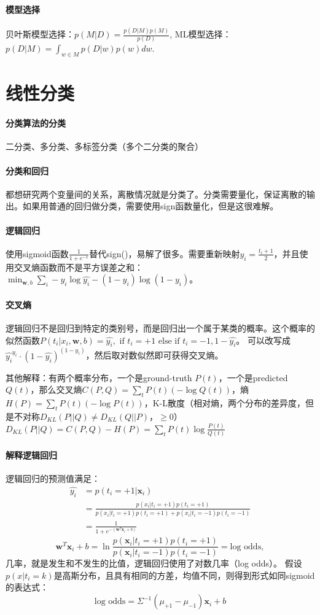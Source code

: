 \paragraph{模型选择} 
贝叶斯模型选择：$p(M|D) = \frac{p(D|M)p(M)}{p(D)}$,
ML模型选择：$p(D|M)=\int_{w\in M} p(D|w)p(w)dw$.

\section{线性分类}

\paragraph{分类算法的分类}二分类、多分类、多标签分类（多个二分类的聚合）

\paragraph{分类和回归} 都想研究两个变量间的关系，离散情况就是分类了。分类需要量化，保证离散的输出。如果用普通的回归做分类，需要使用sign函数量化，但是这很难解。

\paragraph{逻辑回归} 使用sigmoid函数$\frac{1}{1+e^{-x}}$替代sign()，易解了很多。需要重新映射$y_i = \frac{t_i + 1}{2}$，并且使用交叉熵函数而不是平方误差之和：$\min_{\bm w, b} \sum_i - y_i\log\hat{y_i} - (1-y_i)\log(1-y_i)。$

\paragraph{交叉熵} 逻辑回归不是回归到特定的类别号，而是回归出一个属于某类的概率。这个概率的似然函数$P(t_i|x_i,\bm w,b) = \hat{y_i},\text{ if }t_i = +1\text{ else if }t_i = -1, 1 - \hat{y_i}$。
可以改写成$\hat{y_i}^{y_i}\cdot(1-\hat{y_i})^{(1-y_i)}$，然后取对数似然即可获得交叉熵。

其他解释：有两个概率分布，一个是ground-truth $P(t)$，一个是predicted $Q(t)$，那么交叉熵$C(P,Q) = \sum_tP(t)(-\log Q(t))$，熵$H(P)=\sum_tP(t)(-\log P(t))$，K-L散度（相对熵，两个分布的差异度，但是不对称$D_{KL}(P||Q) \neq D_{KL}(Q||P)$，$\ge 0$）$D_{KL}(P||Q) = C(P,Q) - H(P) = \sum_tP(t)\log{\frac{P(t)}{Q(t)}}$

\paragraph{解释逻辑回归}逻辑回归的预测值满足：
$$
\begin{array}{ll}
\hat{y_i} &= p(t_i = +1 |\bm x_i) \\
&= \frac{p(x_i|t_i=+1)p(t_i=+1)}{p(x_i|t_i=+1)p(t_i=+1) + p(x_i|t_i=-1)p(t_i=-1)} \\
& = \frac{1}{1+e^{-(\bm w^T\bm x_i + b)}}
\end{array}
$$
$$\bm w^T\bm x_i + b = \ln \frac{p(\bm x_i| t_i = +1)p(t_i = +1)}{p(\bm x_i| t_i = -1)p(t_i = -1)} = \text{log odds},$$
几率，就是发生和不发生的比值，逻辑回归使用了对数几率（log odds）。
假设$p(x|t_i=k)$是高斯分布，且具有相同的方差，均值不同，则得到形式如同sigmoid的表达式：
$$\text{log odds} = \Sigma^{-1}(\mu_{+1}-\mu_{-1})\bm x_i + b$$

